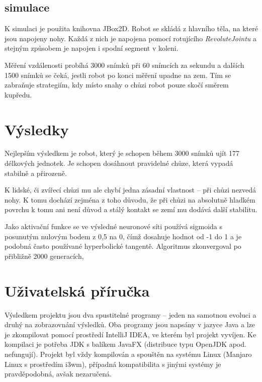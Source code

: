 \documentclass[a4]{article}
\begin{document}
\subsection{simulace}
K simulaci je použita knihovna JBox2D\cite{jbox2D}. Robot se skládá z hlavního těla, na které jsou napojeny nohy. Každá z nich je napojena pomocí rotujícího \emph{RevoluteJointu} a stejným způsobem je napojen i spodní segment v koleni.\par
Měření vzdálenosti probíhá 3000 snímků při 60 snímcích za sekundu a dalších 1500 snímků se čeká, jestli robot po konci měření upadne na zem. Tím se zabraňuje strategiím, kdy místo snahy o chůzi robot pouze skočí směrem kupředu.\par
\section{Výsledky}
Nejlepším výsledkem je robot, který je schopen během 3000 snímků ujít 177 délkových jednotek. Je schopen dosáhnout pravidelné chůze, která vypadá stabilně a přirozeně.\par 
K lidské, či zvířecí chůzi mu ale chybí jedna zásadní vlastnost -- při chůzi nezvedá nohy. K tomu dochází zejména z toho důvodu, že při chůzi na absolutně hladkém povrchu k tomu ani není důvod a stálý kontakt se zemí mu dodává další stabilitu.\par
Jako aktivační funkce se ve výsledné neuronové síti používá sigmoida s posunutým nulovým bodem z 0,5 na 0, čímž dosahuje hodnot od -1 do 1 a je podobná často používané hyperbolické tangentě.
Algoritmus zkonvergoval po přibližně 2000 generacích,
\begin{figure}[h]




\end{figure}
\section{Uživatelská příručka}
Výsledkem projektu jsou dva spustitelné programy -- jeden na samotnou evoluci a druhý na zobrazovnání výsledků. Oba programy jsou napsány v jazyce Java a lze je zkompilovat pomocí prostředí IntelliJ IDEA, ve kterém byl projekt vyvíjen. Ke kompilaci je potřeba JDK s balíkem JavaFX (distribuce typu OpenJDK apod. nefungují). Projekt byl vždy kompilován a spouštěn na systému Linux (Manjaro Linux s prostředím i3wm), případná kompatibilita s jinými systémy je pravděpodobná, avšak nezaručená.\par
\end{document}
